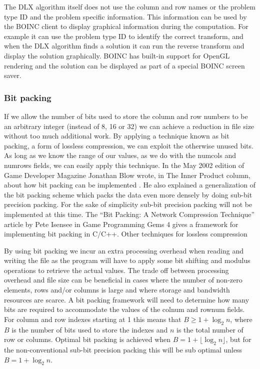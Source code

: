 The DLX algorithm itself does not use the column and row names or the problem type ID and the problem specific information.
This information can be used by the BOINC client to display graphical information during the computation.
For example it can use the problem type ID to identify the correct transform, and when the DLX algorithm finds a solution it can run the reverse transform and display the solution graphically.
BOINC has built-in support for OpenGL rendering and the solution can be displayed as part of a special BOINC screen saver.

\subsubsection{Bit packing}

If we allow the number of bits used to store the column and row numbers to be an arbitrary integer (instead of 8, 16 or 32) we can achieve a reduction in file size without too much additional work.
By applying a technique known as bit packing, a form of lossless compression, we can exploit the otherwise unused bits.
As long as we know the range of our values, as we do with the numcols and numrows fields, we can easily apply this technique.
In the May 2002 edition of Game Developer Magazine Jonathan Blow wrote, in The Inner Product column, about how bit packing can be implemented \cite{gdip_bitpack}.
He also explained a generalization of the bit packing scheme which packs the data even more densely by doing sub-bit precision packing.
For the sake of simplicity sub-bit precision packing will not be implemented at this time.
The ``Bit Packing: A Network Compression Technique'' article \cite{gpg_bitpack} by Pete Isensee in Game Programming Gems 4 gives a framework for implementing bit packing in C/C++.
Other techniques for lossless compression 

By using bit packing we incur an extra processing overhead when reading and writing the file as the program will have to apply some bit shifting and modulus operations to retrieve the actual values.
The trade off between processing overhead and file size can be beneficial in cases where the number of non-zero elements, rows and/or columns is large and where storage and bandwidth resources are scarce.
A bit packing framework will need to determine how many bits are required to accommodate the values of the colnum and rownum fields.
For column and row indexes starting at 1 this means that $B \geq 1 + \log_2{n}$, where $B$ is the number of bits used to store the indexes and $n$ is the total number of row or columns.
Optimal bit packing is achieved when $B = 1 + \lfloor \log_2{n} \rfloor$, but for the non-conventional sub-bit precision packing this will be sub optimal unless $B = 1 + \log_2{n}$.


